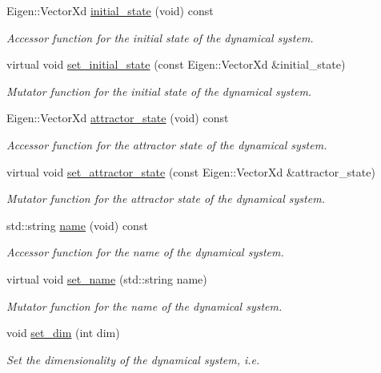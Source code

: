 \begin{DoxyCompactItemize}
Eigen\+::\+Vector\+Xd \hyperlink{group__DynamicalSystems_ga4c7f24e7deec1629548a075015bdc693}{initial\+\_\+state} (void) const 
\begin{DoxyCompactList}\small\item\em Accessor function for the initial state of the dynamical system. \end{DoxyCompactList}\item 
virtual void \hyperlink{group__DynamicalSystems_ga23f05bcccb6a5deda6d2a5364d8ebb16}{set\+\_\+initial\+\_\+state} (const Eigen\+::\+Vector\+Xd \&initial\+\_\+state)
\begin{DoxyCompactList}\small\item\em Mutator function for the initial state of the dynamical system. \end{DoxyCompactList}\item 
Eigen\+::\+Vector\+Xd \hyperlink{group__DynamicalSystems_gaebe3c462bc4a725cb17bcc3d13285f13}{attractor\+\_\+state} (void) const 
\begin{DoxyCompactList}\small\item\em Accessor function for the attractor state of the dynamical system. \end{DoxyCompactList}\item 
virtual void \hyperlink{group__DynamicalSystems_ga32a975e60b5f001308368c7f06b90e18}{set\+\_\+attractor\+\_\+state} (const Eigen\+::\+Vector\+Xd \&attractor\+\_\+state)
\begin{DoxyCompactList}\small\item\em Mutator function for the attractor state of the dynamical system. \end{DoxyCompactList}\item 
std\+::string \hyperlink{group__DynamicalSystems_gacd23346c798f78014a4f82c853e83c88}{name} (void) const 
\begin{DoxyCompactList}\small\item\em Accessor function for the name of the dynamical system. \end{DoxyCompactList}\item 
virtual void \hyperlink{group__DynamicalSystems_ga5175bca5f98f36690a79e323119a1529}{set\+\_\+name} (std\+::string name)
\begin{DoxyCompactList}\small\item\em Mutator function for the name of the dynamical system. \end{DoxyCompactList}\item 
void \hyperlink{group__DynamicalSystems_ga9000562e645149d75717458a97db6ff5}{set\+\_\+dim} (int dim)
\begin{DoxyCompactList}\small\item\em Set the dimensionality of the dynamical system, i.\+e. \end{DoxyCompactList}\end{DoxyCompactItemize}


